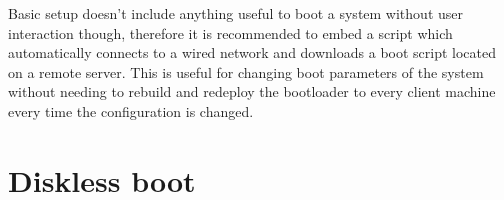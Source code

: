 \documentclass{article}
\begin{document}
Basic setup doesn't include anything useful to boot a system without user interaction though, therefore it is recommended to embed a script which automatically connects to a wired network and downloads a boot script located on a remote server.
This is useful for changing boot parameters of the system without needing to rebuild and redeploy the bootloader to every client machine every time the configuration is changed.

\section{Diskless boot}

\end{document}
